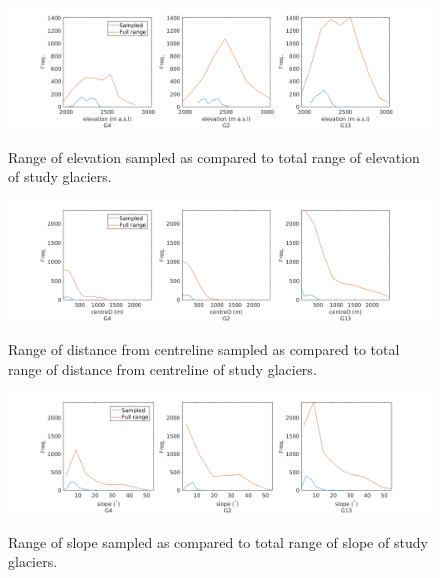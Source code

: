 \documentclass[12pt]{article}
\begin{document}
\begin{landscape}

\begin{figure}
	\centering
	\includegraphics[height = 0.4\textwidth]{SampledRangeTopo_elevation.png}\\
	\caption{Range of elevation sampled as compared to total range of elevation of study glaciers.}
	\label{sampledRange:elev}
\end{figure}

\begin{figure}
	\centering
	\includegraphics[height = 0.4\textwidth]{SampledRangeTopo_centreD.png}\\
	\caption{Range of distance from centreline sampled as compared to total range of distance from centreline of study glaciers.}
	\label{sampledRange:centreD}
\end{figure}

\begin{figure}
	\centering
	\includegraphics[height = 0.4\textwidth]{SampledRangeTopo_slope.png}\\
	\caption{Range of slope sampled as compared to total range of slope of study glaciers.}
	\label{sampledRange:slope}
\end{figure}


\end{landscape}
\end{document}
